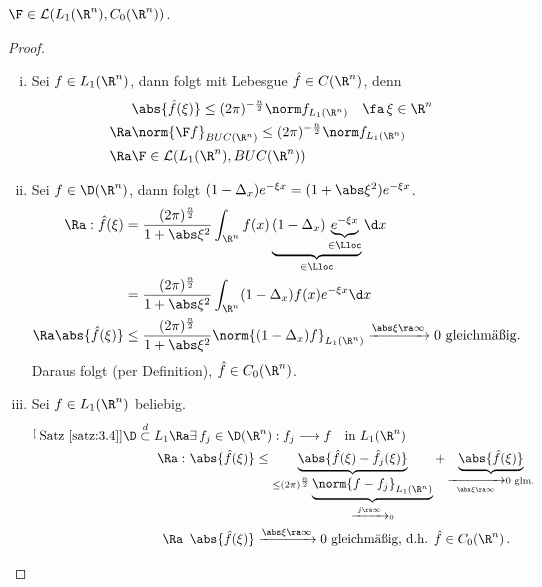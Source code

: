 \begin{theorem}
  \label{theorem:8.3}
$\F \in \mathcal L(L_1(\R^n), C_0(\R^n))$.
\end{theorem}

\begin{proof}
\begin{enumerate}[(i)]
\item Sei $f \in L_1(\R^n)$, dann folgt mit Lebesgue $\hat f\in C(\R^n)$, denn
\begin{align*}
	&\abs{\hat f(\xi)}  \leq (2\pi)^{-\frac n 2} \norm f_{L_1(\R^n)} \quad \fa \, \xi \in \R^n \\
	\Ra & \norm{\F f}_{BUC(\R^n)}  \leq (2\pi)^{-\frac n 2} \norm f_{L_1(\R^n)} \\
	\Ra & \F \in \mathcal L(L_1(\R^n), BUC(\R^n))
\end{align*}
\item Sei $f \in \D (\R^n)$, dann folgt $ (1-\Delta_x) e^{-\xi x} = (1+\abs \xi^2) e^{-\xi x}$.
\begin{align*}
	\Ra : \hat f(\xi) & = \frac{(2\pi)^{\frac n 2}}{1+\abs\xi^2} \int_{\R^n} f(x) \underbrace{(1-\Delta_x) \underbrace{e^{-\xi x}}_{\in\Lloc}}_{\in \Lloc} \d x \\
	& =  \frac{(2\pi)^{\frac n 2}}{1+\abs\xi^2} \int_{\R^n} (1-\Delta_x)f(x) e^{-\xi x} \d x \\
	\Ra \abs{\hat f(\xi)} & \leq \frac{(2\pi)^{\frac n 2}}{1+\abs\xi^2} \norm{(1-\Delta_x) f}_{L_1(\R^n)} \xrightarrow{\abs \xi \ra \infty} 0 \text{ gleichmäßig.}
\end{align*}
Daraus folgt (per Definition), $\hat f \in C_0(\R^n)$.
\item Sei $f\in L_1(\R^n)$ beliebig.
\begin{align*}
	\stackrel[\scriptsize\text{Satz}~\ref{satz:3.4}]{\D \stackrel{d}\subset L_1}\Ra & \exists \, f_j \in \D (\R^n) : f_j \longrightarrow f \quad \text{in } L_1(\R^n) \\
	\Ra: \ & \abs{\hat f(\xi)} \leq \underbrace{\abs{\hat f(\xi) -\hat f_j (\xi)}}_{\leq (2\pi)^{\frac n 2} \underbrace{\norm{f-f_j}_{L_1(\R^n)}}_{\xrightarrow{j \ra \infty} 0}} + \underbrace{\abs{\hat f(\xi)}}_{\xrightarrow[\abs\xi \ra \infty]{} 0 \text{ glm.}} \\
	\Ra \ \,  & \abs{\hat f(\xi)} \xrightarrow{\abs\xi\ra\infty} 0 \text{ gleichmäßig, d.h. }\hat f \in C_0(\R^n)\, . \qedhere
\end{align*}
\end{enumerate}
\end{proof}

